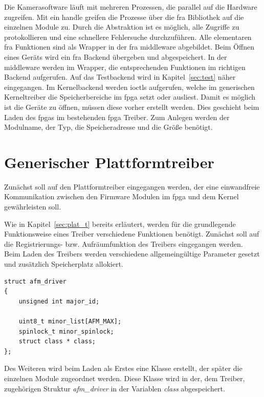 Die Kamerasoftware läuft mit mehreren Prozessen, die parallel auf die Hardware zugreifen. Mit ein \gls{handle} greifen die Prozesse über die \ac{fra} Bibliothek auf die einzelnen Module zu. Durch die Abstraktion ist es möglich, alle Zugriffe zu protokollieren und eine schnellere Fehlersuche durchzuführen. 
Alle elementaren \ac{fra} Funktionen sind als Wrapper in der \ac{fra} \gls{middleware} abgebildet. Beim Öffnen eines Geräts wird ein \ac{fra} Backend übergeben und abgespeichert. In der \gls{middleware} werden im Wrapper, die entsprechenden Funktionen im richtigen Backend aufgerufen. 
Auf das Testbackend wird in Kapitel~\ref{sec:test} näher eingegangen. Im Kernelbackend werden \ac{ioctl}s aufgerufen, welche im generischen Kerneltreiber die Speicherbereiche im \ac{fpga} setzt oder ausliest.
Damit es möglich ist die Geräte zu öffnen, müssen diese vorher erstellt werden. Dies geschieht beim Laden des \ac{fpga}s im bestehenden \ac{fpga} Treiber. Zum Anlegen werden der Modulname, der Typ, die Speicheradresse und die Größe benötigt. 



\section{Generischer Plattformtreiber} \label{sec:plat}
Zunächst soll auf den Plattformtreiber eingegangen werden, der eine einwandfreie Kommunikation zwischen den Firmware Modulen im \ac{fpga} und dem Kernel gewährleisten soll.


Wie in Kapitel~\ref{sec:plat_t} bereits erläutert, werden für die grundlegende Funktionsweise eines Treiber verschiedene Funktionen benötigt. Zunächst soll auf die Registrierungs- bzw. Aufräumfunktion des Treibers eingegangen werden.\\


Beim Laden des Treibers werden verschiedene allgemeingültige Parameter gesetzt und zusätzlich Speicherplatz allokiert. 
\begin{lstfloat}
\begin{lstlisting}
struct afm_driver
{
	unsigned int major_id;

	uint8_t minor_list[AFM_MAX];
	spinlock_t minor_spinlock;
	struct class * class;
};
\end{lstlisting}
\end{lstfloat}

Des Weiteren wird beim Laden als Erstes eine Klasse erstellt, der später die einzelnen Module zugeordnet werden. Diese Klasse wird in der, dem Treiber, zugehörigen Struktur \textit{afm\_driver} in der Variablen \textit{class} abgespeichert. 

